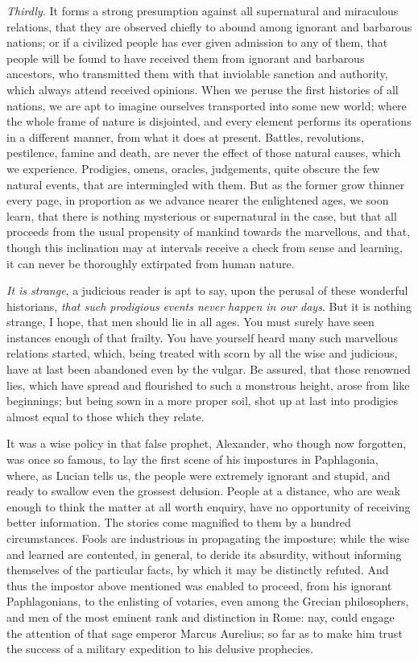 \documentclass[]{article}
\begin{document}
\begin{sectionbody}
\humeparagraph  \emph{Thirdly}. It forms a strong presumption against all supernatural and miraculous relations, that they are observed chiefly to abound among ignorant and barbarous nations; or if a civilized people has ever given admission to any of them, that people will be found to have received them from ignorant and barbarous ancestors, who transmitted them with that inviolable sanction and authority, which always attend received opinions. When we peruse the first histories of all nations, we are apt to imagine ourselves transported into some new world; where the whole frame of nature is disjointed, and every element performs its operations in a different manner, from what it does at present. Battles, revolutions, pestilence, famine and death, are never the effect of those natural causes, which we experience. Prodigies, omens, oracles, judgements, quite obscure the few natural events, that are intermingled with them. But as the former grow thinner every page, in proportion as we advance nearer the enlightened ages, we soon learn, that there is nothing mysterious or supernatural in the case, but that all proceeds from the usual propensity of mankind towards the marvellous, and that, though this inclination may at intervals receive a check from sense and learning, it can never be thoroughly extirpated from human nature.

\humeparagraph  \emph{It is strange}, a judicious reader is apt to say, upon the perusal of these wonderful historians, \emph{that such prodigious} \emph{events never happen in our days}. But it is nothing strange, I hope, that men should lie in all ages. You must surely have seen instances enough of that frailty. You have yourself heard many such marvellous relations started, which, being treated with scorn by all the wise and judicious, have at last been abandoned even by the vulgar. Be assured, that those renowned lies, which have spread and flourished to such a monstrous height, arose from like beginnings; but being sown in a more proper soil, shot up at last into prodigies almost equal to those which they relate.

\humeparagraph  It was a wise policy in that false prophet, Alexander, who though now forgotten, was once so famous, to lay the first scene of his impostures in Paphlagonia, where, as Lucian tells us, the people were extremely ignorant and stupid, and ready to swallow even the grossest delusion. People at a distance, who are weak enough to think the matter at all worth enquiry, have no opportunity of receiving better information. The stories come magnified to them by a hundred circumstances. Fools are industrious in propagating the imposture; while the wise and learned are contented, in general, to deride its absurdity, without informing themselves of the particular facts, by which it may be distinctly refuted. And thus the impostor above mentioned was enabled to proceed, from his ignorant Paphlagonians, to the enlisting of votaries, even among the Grecian philosophers, and men of the most eminent rank and distinction in Rome: nay, could engage the attention of that sage emperor Marcus Aurelius; so far as to make him trust the success of a military expedition to his delusive prophecies.


\end{sectionbody}
\end{document}
